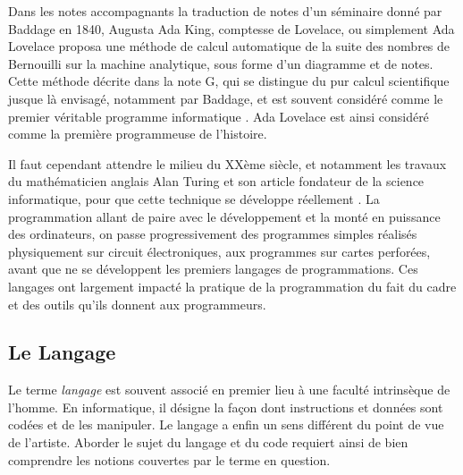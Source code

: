 \documentclass[12pt]{article} %
\begin{document}
Dans les notes accompagnants la traduction de notes d'un séminaire donné par Baddage en 1840, Augusta Ada King, comptesse de Lovelace, ou simplement Ada Lovelace proposa une méthode de calcul automatique de la suite des nombres de Bernouilli sur la machine analytique, sous forme d'un diagramme et de notes. Cette méthode décrite dans la note G, qui se distingue du pur calcul scientifique jusque là envisagé, notamment par Baddage, et est souvent considéré comme le premier véritable programme informatique \cite{JKrysa}. Ada Lovelace est ainsi considéré comme la première programmeuse de l'histoire. 

Il faut cependant attendre le milieu du XXème siècle, et notamment les travaux du mathématicien anglais Alan Turing et son article fondateur de la science informatique, pour que cette technique se développe réellement . La programmation allant de paire avec le développement et la monté en puissance des ordinateurs, on passe progressivement des programmes simples réalisés physiquement sur circuit électroniques, aux programmes sur cartes perforées, avant que ne se développent les premiers langages de programmations. Ces langages ont largement impacté la pratique de la programmation du fait du cadre et des outils qu'ils donnent aux programmeurs.


\subsection{Le Langage}

Le terme \textit{langage} est souvent associé en premier lieu à une faculté intrinsèque de l'homme. En informatique, il désigne la façon dont instructions et données sont codées et de les manipuler. Le langage a enfin un sens différent du point de vue de l'artiste. Aborder le sujet du langage et du code requiert ainsi de bien comprendre les notions couvertes par le terme en question. 
\end{document}
